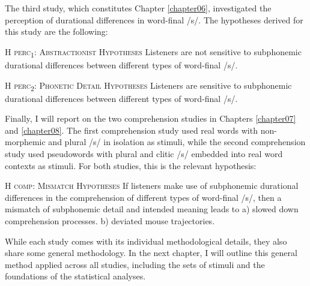 The third study, which constitutes Chapter \ref{chapter06}, investigated the perception of durational differences in word-final /s/. The hypotheses derived for this study are the following:

\begin{description}
\item\textsc{H perc\textsubscript{1}}: \textsc{Abstractionist Hypotheses} \newline
Listeners are not sensitive to subphonemic durational differences between different types of word-final /s/.

\item\textsc{H perc\textsubscript{2}}: \textsc{Phonetic Detail Hypotheses} \newline
Listeners are sensitive to subphonemic durational differences between different types of word-final /s/.
\end{description}

Finally, I will report on the two comprehension studies in Chapters \ref{chapter07} and \ref{chapter08}. The first comprehension study used real words with non-morphemic and plural /s/ in isolation as stimuli, while the second comprehension study used pseudowords with plural and clitic /s/ embedded into real word contexts as stimuli. For both studies, this is the relevant hypothesis:

\begin{description}

\item\textsc{H comp}: \textsc{Mismatch Hypotheses} \newline
If listeners make use of subphonemic durational differences in the comprehension of different types of word-final /s/, then a mismatch of subphonemic detail and intended meaning leads to\newline
a) slowed down comprehension processes.\newline
b) deviated mouse trajectories.

\end{description}

While each study comes with its individual methodological details, they also share some general methodology. In the next chapter, I will outline this general method applied across all studies, including the sets of stimuli and the foundations of the statistical analyses.

